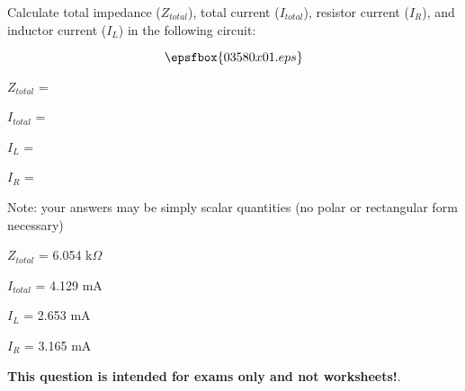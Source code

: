 

Calculate total impedance ($Z_{total}$), total current ($I_{total}$), resistor current ($I_R$), and inductor current ($I_L$) in the following circuit:

$$\epsfbox{03580x01.eps}$$

$Z_{total}$ =

\vskip 10pt

$I_{total}$ = 

\vskip 10pt

$I_{L}$ = 

\vskip 10pt

$I_{R}$ = 

\vskip 10pt

Note: your answers may be simply scalar quantities (no polar or rectangular form necessary)







$Z_{total}$ = 6.054 k$\Omega$

\vskip 10pt

$I_{total}$ = 4.129 mA

\vskip 10pt

$I_{L}$ = 2.653 mA

\vskip 10pt

$I_{R}$ = 3.165 mA







{\bf This question is intended for exams only and not worksheets!}.



